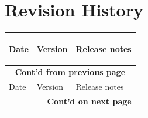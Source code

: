 \section*{Revision History}\label{revision-history}
\rhead{\Navigation}

\begin{longtable}[l]{ | m{2cm} | m{1.5cm} | m{12cm} | } \hline

    \rowcolor{lightgray}
    Date & Version & \hypertarget{Release notes}{Release notes}\\\hline
    \endfirsthead

    \multicolumn{3}{c}{\bfseries Cont'd from previous page}\\\hline
    \rowcolor{lightgray}
    Date & Version & Release notes\\\hline
    \endhead

    \multicolumn{3}{r}{\textbf{Cont'd on next page}}\\
    \endfoot

    \endlastfoot



\end{longtable}
